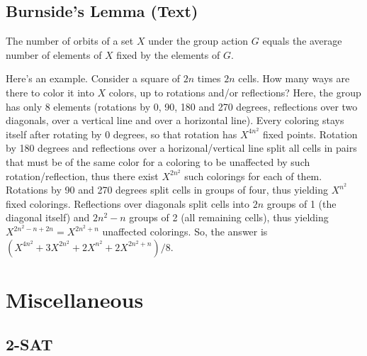 \documentclass[12pt]{extarticle}
\begin{document}
\begin{multicols*}{2}
\subsection{Burnside's Lemma (Text)} %
The number of orbits of a set $X$ under the group action $G$ equals the average
number of elements of $X$ fixed by the elements of $G$.

Here's an example. Consider a square of $2n$ times $2n$ cells. How many ways
are there to color it into $X$ colors, up to rotations and/or reflections?
Here, the group has only 8 elements (rotations by 0, 90, 180 and 270 degrees,
reflections over two diagonals, over a vertical line and over a horizontal
line). Every coloring stays itself after rotating by 0 degrees, so that
rotation has $X^{4n^2}$ fixed points. Rotation by 180 degrees and reflections
over a horizonal/vertical line split all cells in pairs that must be of the
same color for a coloring to be unaffected by such rotation/reflection, thus
there exist $X^{2n^2}$ such colorings for each of them. Rotations by 90 and 270
degrees split cells in groups of four, thus yielding $X^{n^2}$ fixed colorings.
Reflections over diagonals split cells into $2n$ groups of 1 (the diagonal
itself) and $2n^2-n$ groups of 2 (all remaining cells), thus yielding
$X^{2n^2-n+2n}=X^{2n^2+n}$ unaffected colorings.  So, the answer is
$(X^{4n^2}+3X^{2n^2}+2X^{n^2}+2X^{2n^2+n})/8$.

\section{Miscellaneous}
\subsection{2-SAT} %


\end{multicols*}
\end{document}
